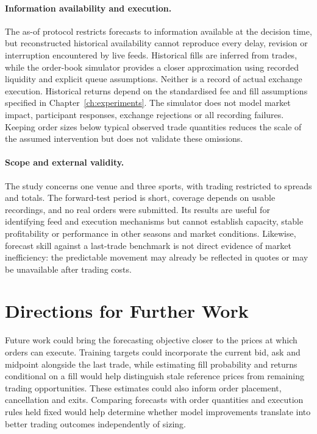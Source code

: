 \documentclass[12pt,a4paper,oneside]{report}
\begin{document}
\paragraph{Information availability and execution.}
The as-of protocol restricts forecasts to information available at the decision
time, but reconstructed historical availability cannot reproduce every delay,
revision or interruption encountered by live feeds. Historical fills are
inferred from trades, while the order-book simulator provides a closer
approximation using recorded liquidity and explicit queue assumptions.
Neither is a record of actual exchange execution. Historical returns depend
on the standardised fee and fill assumptions specified in
Chapter~\ref{ch:experiments}. The simulator does not model market impact,
participant responses, exchange rejections or all recording failures. Keeping
order sizes below typical observed trade quantities reduces the scale of the
assumed intervention but does not validate these omissions.

\paragraph{Scope and external validity.}
The study concerns one venue and three sports, with trading restricted to
spreads and totals. The forward-test period is short, coverage depends on
usable recordings, and no real orders were submitted. Its results are useful
for identifying feed and execution mechanisms but cannot establish capacity,
stable profitability or performance in other seasons and market conditions.
Likewise, forecast skill against a last-trade benchmark is not direct evidence
of market inefficiency: the predictable movement may already be reflected in
quotes or may be unavailable after trading costs.

\section{Directions for Further Work}
Future work could bring the forecasting objective closer to the prices at
which orders can execute. Training targets could incorporate the current bid,
ask and midpoint alongside the last trade, while estimating fill probability
and returns conditional on a fill would help distinguish stale reference
prices from remaining trading opportunities. These estimates could also
inform order placement, cancellation and exits. Comparing forecasts with
order quantities and execution rules held fixed would help determine whether
model improvements translate into better trading outcomes independently of
sizing.
\end{document}
